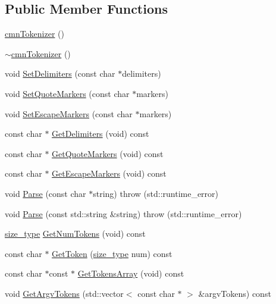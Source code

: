\subsection*{Public Member Functions}
\begin{DoxyCompactItemize}
\item 
\hyperlink{classcmn_tokenizer_ad18f864eb2837d7d6c4f8f595bb28e12}{cmn\+Tokenizer} ()
\item 
\hyperlink{classcmn_tokenizer_a3590cb8c8426fdd6ff137bf80de4866c}{$\sim$cmn\+Tokenizer} ()
\item 
void \hyperlink{classcmn_tokenizer_aa5a30cc94732f312ed82370e218be236}{Set\+Delimiters} (const char $\ast$delimiters)
\item 
void \hyperlink{classcmn_tokenizer_accde43d610ec450536f310e6f832eb3c}{Set\+Quote\+Markers} (const char $\ast$markers)
\item 
void \hyperlink{classcmn_tokenizer_a7bb0f1c5767837a9021898139956bee5}{Set\+Escape\+Markers} (const char $\ast$markers)
\item 
const char $\ast$ \hyperlink{classcmn_tokenizer_a18d44606191cfdd4b9aba9683e5810a4}{Get\+Delimiters} (void) const 
\item 
const char $\ast$ \hyperlink{classcmn_tokenizer_ab9ddd7ecb5f418b4cc11c049f7369581}{Get\+Quote\+Markers} (void) const 
\item 
const char $\ast$ \hyperlink{classcmn_tokenizer_a3656f9c6bdd738742111edfdc960360e}{Get\+Escape\+Markers} (void) const 
\item 
void \hyperlink{classcmn_tokenizer_a1c90fd9b013360f7de462e8bf546a663}{Parse} (const char $\ast$string)  throw (std\+::runtime\+\_\+error)
\item 
void \hyperlink{classcmn_tokenizer_a73139aca8f34b41e94822b7a86095714}{Parse} (const std\+::string \&string)  throw (std\+::runtime\+\_\+error)
\item 
\hyperlink{classcmn_tokenizer_aa1b3819de936a3639e8ef5841f7fe762}{size\+\_\+type} \hyperlink{classcmn_tokenizer_a3a374f093c9e476458394a148c4f82da}{Get\+Num\+Tokens} (void) const 
\item 
const char $\ast$ \hyperlink{classcmn_tokenizer_aed48e923ab4b6b98fd284838cb5d0d49}{Get\+Token} (\hyperlink{classcmn_tokenizer_aa1b3819de936a3639e8ef5841f7fe762}{size\+\_\+type} num) const 
\item 
const char $\ast$const $\ast$ \hyperlink{classcmn_tokenizer_ae09e7f92f12ce54fa4116ba95f4af942}{Get\+Tokens\+Array} (void) const 
\item 
void \hyperlink{classcmn_tokenizer_a2fe39c6751f33cf1b81c9461d47b1462}{Get\+Argv\+Tokens} (std\+::vector$<$ const char $\ast$ $>$ \&argv\+Tokens) const 
\end{DoxyCompactItemize}
